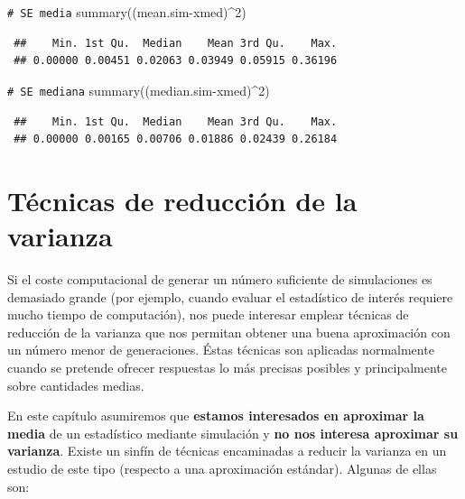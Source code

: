 \documentclass[
  10pt,
]{book}
\newenvironment{Shaded}{\begin{snugshade}}{\end{snugshade}}
\newcommand{\CommentTok}[1]{\textcolor[rgb]{0.56,0.35,0.01}{\textit{#1}}}
\newcommand{\DecValTok}[1]{\textcolor[rgb]{0.00,0.00,0.81}{#1}}
\newcommand{\FunctionTok}[1]{\textcolor[rgb]{0.00,0.00,0.00}{#1}}
\newcommand{\NormalTok}[1]{#1}
\newcommand{\SpecialCharTok}[1]{\textcolor[rgb]{0.00,0.00,0.00}{#1}}
\theoremstyle{break}
\theoremstyle{nonumberplain}
\renewcommand{\CommentTok}[1]{\textcolor[rgb]{0.41,0.41,0.41}{\texttt{#1}}}
\begin{document}
\begin{enumerate}
\begin{Shaded}
\begin{Highlighting}[]
\CommentTok{\# SE media}
\FunctionTok{summary}\NormalTok{((mean.sim}\SpecialCharTok{{-}}\NormalTok{xmed)}\SpecialCharTok{\^{}}\DecValTok{2}\NormalTok{) }
\end{Highlighting}
\end{Shaded}

\begin{verbatim}
 ##    Min. 1st Qu.  Median    Mean 3rd Qu.    Max. 
 ## 0.00000 0.00451 0.02063 0.03949 0.05915 0.36196
\end{verbatim}

\begin{Shaded}
\begin{Highlighting}[]
\CommentTok{\# SE mediana}
\FunctionTok{summary}\NormalTok{((median.sim}\SpecialCharTok{{-}}\NormalTok{xmed)}\SpecialCharTok{\^{}}\DecValTok{2}\NormalTok{) }
\end{Highlighting}
\end{Shaded}

\begin{verbatim}
 ##    Min. 1st Qu.  Median    Mean 3rd Qu.    Max. 
 ## 0.00000 0.00165 0.00706 0.01886 0.02439 0.26184
\end{verbatim}
\end{enumerate}

\hypertarget{red-varianza}{%
\chapter{Técnicas de reducción de la varianza}\label{red-varianza}}

Si el coste computacional de generar un número suficiente de simulaciones es demasiado grande (por ejemplo, cuando evaluar el estadístico de interés requiere mucho tiempo de computación), nos puede interesar emplear técnicas de reducción de la varianza que nos permitan obtener una buena aproximación con un número menor de generaciones. Éstas técnicas son aplicadas normalmente cuando se pretende ofrecer respuestas lo más precisas posibles y principalmente sobre cantidades medias.

En este capítulo asumiremos que \textbf{estamos interesados en aproximar la media} de un estadístico mediante simulación y \textbf{no nos interesa aproximar su varianza}.
Existe un sinfín de técnicas encaminadas a reducir la varianza en un estudio de este tipo (respecto a una aproximación estándar).
Algunas de ellas son:
\end{document}
